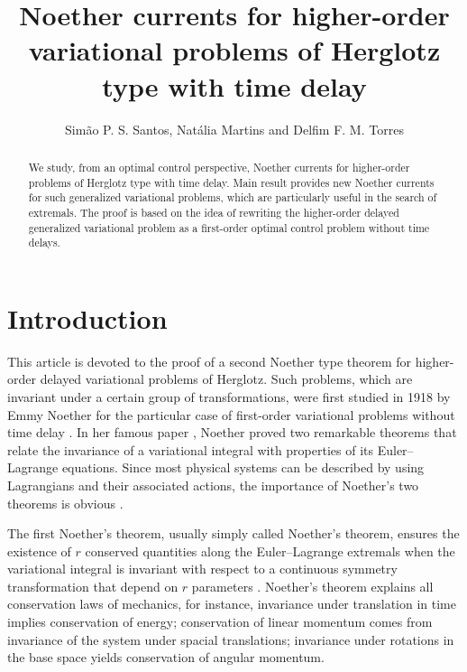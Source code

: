 \documentclass{my-aims}
\title[Noether currents for problems of Herglotz]{%
Noether currents for higher-order variational problems of Herglotz type with time delay}
\author[S. P. S. Santos, N. Martins and D. F. M. Torres]{Sim\~{a}o P. S. Santos,
Nat\'{a}lia Martins and Delfim F. M. Torres}
\theoremstyle{definition}
\begin{document}

\begin{abstract}
We study, from an optimal control perspective, 
Noether currents for higher-order problems 
of Herglotz type with time delay.
Main result provides new Noether currents for such 
generalized variational problems, 
which are particularly useful in the search of extremals. 
The proof is based on the idea of rewriting the higher-order 
delayed generalized variational problem as a first-order 
optimal control problem without time delays.
\end{abstract}

\maketitle


\section{Introduction}

This article is devoted to the proof of a second Noether 
type theorem for higher-order delayed variational problems of Herglotz.
Such problems, which are invariant under a certain group of transformations,
were first studied in 1918 by Emmy Noether  
for the particular case of first-order variational 
problems without time delay \cite{Noether1918}. 
In her famous paper \cite{Noether1918}, Noether proved 
two remarkable theorems that relate the invariance 
of a variational integral with properties 
of its Euler--Lagrange equations. Since most
physical systems can be described by using Lagrangians 
and their associated actions, the importance 
of Noether's two theorems is obvious \cite{MR3540628}.

The first Noether's theorem, usually simply called Noether's theorem,
ensures the existence of $r$ conserved quantities along 
the Euler--Lagrange extremals when the variational integral 
is invariant with respect to a continuous symmetry 
transformation that depend on $r$ parameters \cite{cpaa}.
Noether's theorem explains all conservation laws of mechanics,  
for instance, invariance under translation in time 
implies conservation of energy; 
conservation of linear momentum comes from invariance of the system 
under spacial translations; invariance under rotations 
in the base space yields conservation of angular momentum.
\end{document}
